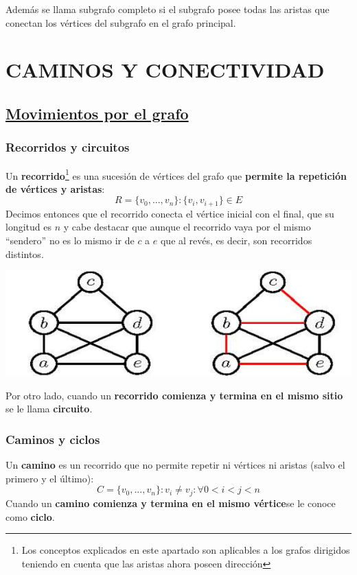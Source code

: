 \documentclass[10pt,a4paper,openright]{book}
\begin{document}
Además se llama subgrafo completo si el subgrafo posee todas las aristas que conectan los vértices del subgrafo en el grafo principal.

\section*{CAMINOS Y CONECTIVIDAD}
\subsection*{\underline{Movimientos por el grafo}}
\subsubsection*{Recorridos y circuitos}
Un \textbf{recorrido}\footnote{Los conceptos explicados en este apartado son aplicables a los grafos dirigidos teniendo en cuenta que las aristas ahora poseen dirección} es una sucesión de vértices del grafo que \textbf{permite la repetición de vértices y aristas}:
$$R=\{v_0,..., v_n\}: \{v_i, v_{i+1}\}\in E$$
Decimos entonces que el recorrido conecta el vértice inicial con el final, que su longitud es $n$ y cabe destacar que aunque el recorrido vaya por el mismo ``sendero'' no es lo mismo ir de $c$ a $e$ que al revés, es decir, son recorridos distintos.

\begin{center}
\includegraphics[scale=0.65]{recorridos}
\end{center}

Por otro lado, cuando un \textbf{recorrido comienza y termina en el mismo sitio} se le llama \textbf{circuito}.

\subsubsection*{Caminos y ciclos}
Un \textbf{camino} es un recorrido que no permite repetir ni vértices ni aristas (salvo el primero y el último):
$$C=\{v_0, ..., v_n\}: v_i\neq v_j: \forall 0< i < j< n$$
Cuando un \textbf{camino comienza y termina en el mismo vértice}se le conoce como \textbf{ciclo}.
\end{document}
